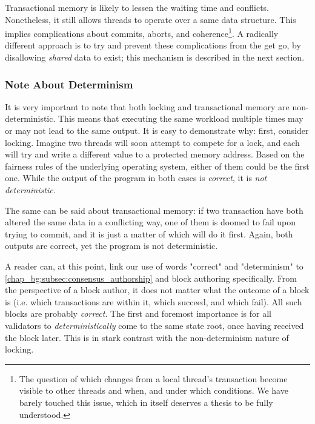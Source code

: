 Transactional memory is likely to lessen the waiting time and conflicts. Nonetheless, it still
allows threads to operate over a same data structure. This implies complications about commits,
aborts, and coherence\footnote{The question of which changes from a local thread's transaction
become visible to other threads and when, and under which conditions. We have barely touched this
issue, which in itself deserves a thesis to be fully understood.}. A radically different approach is to
try and prevent these complications from the get go, by disallowing \textit{shared} data to
exist; this mechanism is described in the next section.

\subsubsection*{Note About Determinism}


It is very important to note that both locking and transactional memory are non-deterministic. This
means that executing the same workload multiple times may or may not lead to the same output.
It is easy to demonstrate why: first, consider locking. Imagine two threads will soon attempt to compete for a lock, and each will
try and write a different value to a protected memory address. Based on the fairness rules of the
underlying operating system, either of them could be the first one. While the output of the program
in both cases is \textit{correct}, it is \textit{not deterministic}.

The same can be said about transactional memory: if two transaction have both altered the same data
in a conflicting way, one of them is doomed to fail upon trying to commit, and it is just a matter of
which will do it first. Again, both outputs are correct, yet the program is not deterministic.

\begin{remark}
	A reader can, at this point, link our use of words "correct" and "determinism" to
	\ref{chap_bg:subsec:consensus_authorship} and block authoring specifically. From the perspective
	of a block author, it does not matter what the outcome of a block is (i.e. which transactions
	are within it, which succeed, and which fail). All such blocks are probably \textit{correct}. The
	first and foremost importance is for all validators to \textit{deterministically} come to the same state root, once having received the block later. This is
	in stark contrast with the non-determinism nature of locking.
\end{remark}


